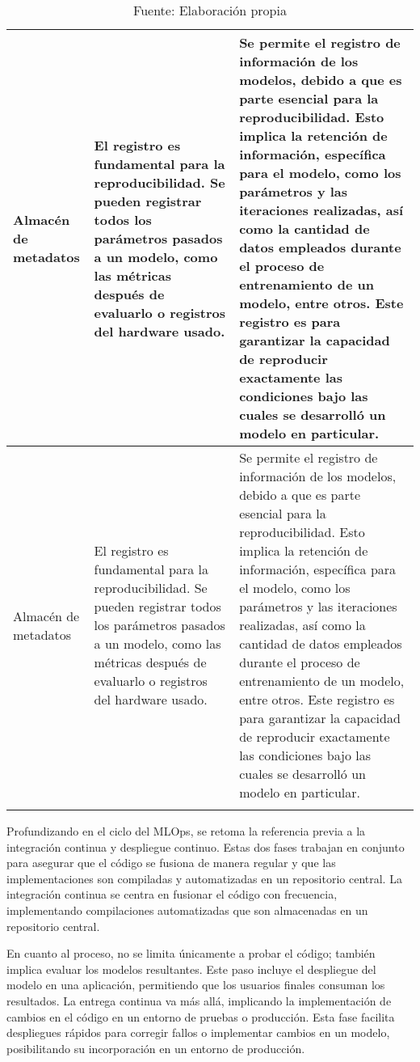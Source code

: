 \begin{longtable}{|p{3cm}|p{5cm}|p{6cm}|}
        \hline
        Almacén de metadatos & El registro es fundamental para la reproducibilidad. Se pueden registrar todos los parámetros pasados a un modelo, como las métricas después de evaluarlo o registros del hardware usado. & Se permite el registro de información de los modelos, debido a que es parte esencial para la reproducibilidad. Esto implica la retención de información, específica para el modelo, como los parámetros y las iteraciones realizadas, así como la cantidad de datos empleados durante el proceso de entrenamiento de un modelo, entre otros. Este registro es para garantizar la capacidad de reproducir exactamente las condiciones bajo las cuales se desarrolló un modelo en particular. \\
        \hline
        Almacén de metadatos & El registro es fundamental para la reproducibilidad. Se pueden registrar todos los parámetros pasados a un modelo, como las métricas después de evaluarlo o registros del hardware usado. & Se permite el registro de información de los modelos, debido a que es parte esencial para la reproducibilidad. Esto implica la retención de información, específica para el modelo, como los parámetros y las iteraciones realizadas, así como la cantidad de datos empleados durante el proceso de entrenamiento de un modelo, entre otros. Este registro es para garantizar la capacidad de reproducir exactamente las condiciones bajo las cuales se desarrolló un modelo en particular. \\
    \hline
    \caption*{\footnotesize Fuente: Elaboración propia}
    \label{tab:tabCicloMlops}
\end{longtable}

\newpage

Profundizando en el ciclo del MLOps, se retoma la referencia previa a la integración continua y despliegue continuo. Estas dos fases trabajan en conjunto para asegurar que el código se fusiona de manera regular y que las implementaciones son compiladas y automatizadas en un repositorio central. La integración continua se centra en fusionar el código con frecuencia, implementando compilaciones automatizadas que son almacenadas en un repositorio central.

En cuanto al proceso, no se limita únicamente a probar el código; también implica evaluar los modelos resultantes. Este paso incluye el despliegue del modelo en una aplicación, permitiendo que los usuarios finales consuman los resultados. La entrega continua va más allá, implicando la implementación de cambios en el código en un entorno de pruebas o producción. Esta fase facilita despliegues rápidos para corregir fallos o implementar cambios en un modelo, posibilitando su incorporación en un entorno de producción.

